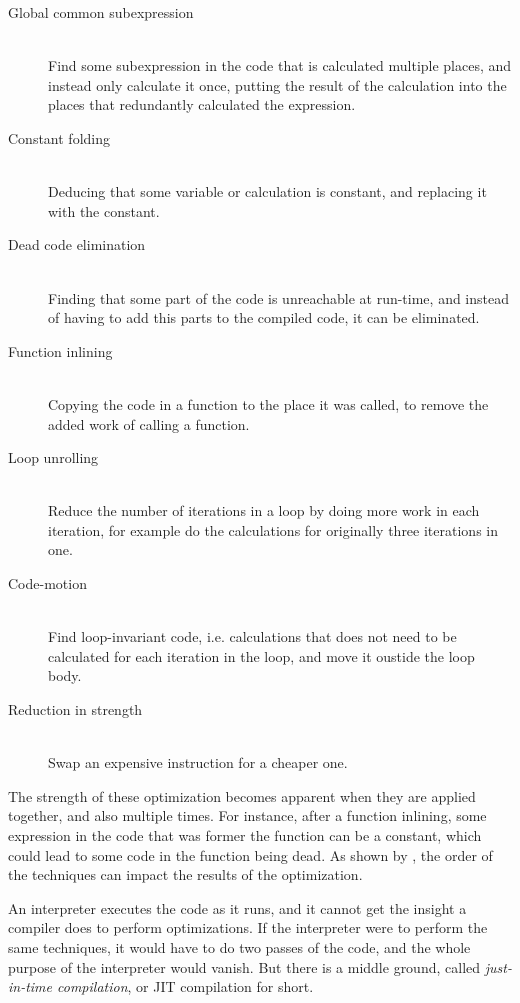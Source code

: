 \begin{description}
\item[Global common subexpression] \hfill \\
    Find some subexpression in the code that is calculated multiple places, and instead only calculate it once, putting the result of the calculation into the places that redundantly calculated the expression.
\item[Constant folding] \hfill \\
    Deducing that some variable or calculation is constant, and replacing it with the constant.
\item[Dead code elimination] \hfill \\
    Finding that some part of the code is unreachable at run-time, and instead of having to add this parts to the compiled code, it can be eliminated.
\item[Function inlining] \hfill \\
    Copying the code in a function to the place it was called, to remove the added work of calling a function.
\item[Loop unrolling] \hfill \\
    Reduce the number of iterations in a loop by doing more work in each iteration, for example do the calculations for originally three iterations in one.
\item[Code-motion] \hfill \\
    Find loop-invariant code, i.e. calculations that does not need to be calculated for each iteration in the loop, and move it oustide the loop body.
\item[Reduction in strength] \hfill \\
    Swap an expensive instruction for a cheaper one.
\end{description}

The strength of these optimization becomes apparent when they are applied together, and also multiple times.
For instance, after a function inlining, some expression in the code that was former the function can be a constant, which could lead to some code in the function being dead.
As shown by \citeauthor{delima13}, the order of the techniques can impact the results of the optimization.

An interpreter executes the code as it runs, and it cannot get the insight a compiler does to perform optimizations.
If the interpreter were to perform the same techniques, it would have to do two passes of the code, and the whole purpose of the interpreter would vanish.
But there is a middle ground, called \emph{just-in-time compilation}, or JIT compilation for short.


